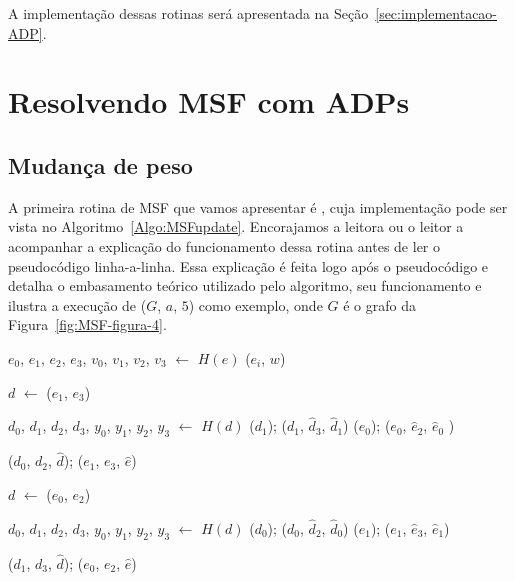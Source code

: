 A implementação dessas rotinas será apresentada na Seção~\ref{sec:implementacao-ADP}.


\section{Resolvendo MSF com ADPs}

\subsection{Mudança de peso}
A primeira rotina de MSF que vamos apresentar é \MSFupdate{}, cuja implementação pode ser vista no Algoritmo~\ref{Algo:MSFupdate}.
Encorajamos a leitora ou o leitor a acompanhar a explicação do funcionamento dessa rotina antes de ler o pseudocódigo linha-a-linha.
Essa explicação é feita logo após o pseudocódigo e detalha o embasamento teórico utilizado pelo algoritmo, seu funcionamento e ilustra a execução de \MSFupdate($G$, $a$, $5$) como exemplo, onde $G$ é o grafo da Figura~\ref{fig:MSF-figura-4}.


\begin{algorithm}[htb]
\caption{\MSFupdate($G$, $e$, $w$)}
\label{Algo:MSFupdate}
\begin{algorithmic}[1]
\State $e_0$, $e_1$, $e_2$, $e_3$, $v_0$, $v_1$, $v_2$, $v_3$ $\gets$ $H(e)$
\State  \LCOAddCost($e_i$, $w$)
\EndFor

\label{Algo:MSFupdate:linha:if} 
\State $d$ $\gets$ \LCOMin($e_1$, $e_3$)\label{Algo:MSFupdate:linhamin}

\State $d_0$, $d_1$, $d_2$, $d_3$, $y_0$, $y_1$, $y_2$, $y_3$ $\gets$ $H(d)$
\label{Algo:MSFupdate:linha:compara}
\State \LCOCycle($d_1$); \LCOSplit($d_1$, $\hat d_3$, $\hat d_1$)
\State \LCOCycle($e_0$); \LCOSplit($e_0$, $\hat e_2$, $\hat e_0$ )\label{Algo:MSFupdate:linhasplit}

\State \LCOMerge($d_0$, $d_2$, $\hat d$); \LCOMerge($e_1$, $e_3$, $\hat e$)\label{Algo:MSFupdate:linhas:Merge}

\EndIf

\Else{}
\State $d$ $\gets$ \LCOMax($e_0$, $e_2$)\label{Algo:MSFupdate:dualinicio}

\State $d_0$, $d_1$, $d_2$, $d_3$, $y_0$, $y_1$, $y_2$, $y_3$ $\gets$ $H(d)$
\State \LCOCycle($d_0$); \LCOSplit($d_0$, $\hat d_2$, $\hat d_0$)
\State \LCOCycle($e_1$); \LCOSplit($e_1$, $\hat e_3$, $\hat e_1$)

\State \LCOMerge($d_1$, $d_3$, $\hat d$); \LCOMerge($e_0$, $e_2$, $\hat e$)

\EndIf
\EndIf\label{Algo:MSFupdate:dualfim}
\end{algorithmic}
\end{algorithm}

